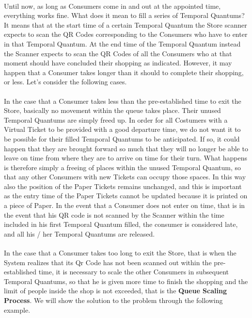 \documentclass[a4paper, 12pt, oneside, table]{article}
\newcommand{\yasmin}[1]{\textcolor{Red}{#1}}
\begin{document}
\\
Until now, as long as Consumers come in and out at the appointed time, everything works fine. What does it mean to fill a series of Temporal Quantums? It means that at the start time of a certain Temporal Quantum the Store scanner expects to scan the QR Codes corresponding to the Consumers who have to enter in that Temporal Quantum. At the end time of the Temporal Quantum instead %
the Scanner expects to scan the QR Codes of all the Consumers who at that moment should have concluded their shopping as indicated. However, it may happen that a Consumer takes longer than it should to complete their shopping, or less. Let's consider the following cases.\\
\\
In the case that a Consumer takes less than the pre-established time to exit the Store, basically no movement within the queue takes place. Their unused Temporal Quantums are simply freed up. In order for all Costumers with a Virtual Ticket to be provided with a good departure time, we do not want it to be possible for their filled Temporal Quantums to be anticipated. If so, it could happen that they are brought forward so much that they will no longer be able to leave on time from where they are to arrive on time for their turn. What happens is therefore simply a freeing of places within the unused Temporal Quantum, so that any other Consumers with new Tickets can occupy those spaces. In this way also the position of the Paper Tickets remains unchanged, and this is important as the entry time of the Paper Tickets cannot be updated because it is printed on a piece of Paper. In the event that a Consumer does not enter on time, that is in the event that his QR code is not scanned by the Scanner within the time included in his first Temporal Quantum filled, the consumer is considered late, and all his / her Temporal Quantums are released.\\
\\
In the case that a Consumer takes too long to exit the Store, that is when the System realizes that its Qr Code has not been scanned out within the pre-established time, it is necessary to scale the other Consumers in subsequent Temporal Quantums, so that he is given more time to finish the shopping and the limit of people inside the shop is not exceeded, that is the \textbf{Queue Scaling Process}. We will show the solution to the problem through the following example.\\
\end{document}
